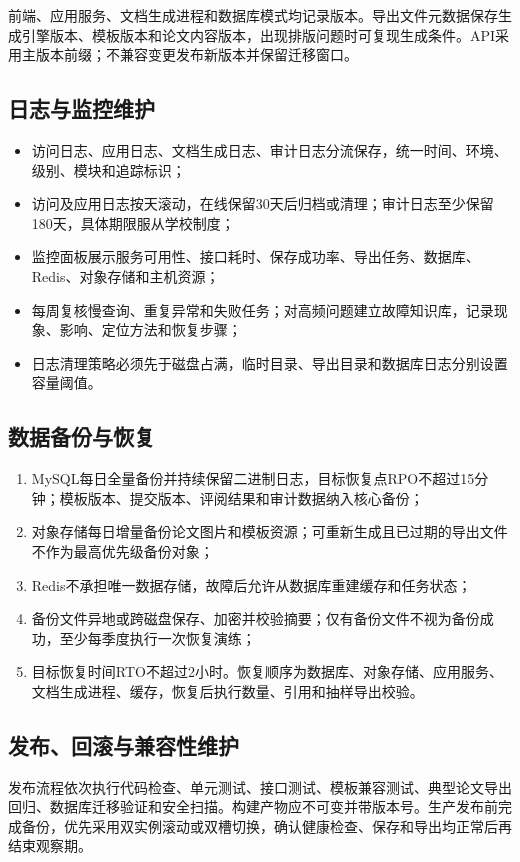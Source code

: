 \documentclass{../template/softeng}
\begin{document}
	前端、应用服务、文档生成进程和数据库模式均记录版本。导出文件元数据保存生成引擎版本、模板版本和论文内容版本，出现排版问题时可复现生成条件。API采用主版本前缀；不兼容变更发布新版本并保留迁移窗口。
	
	\subsection{日志与监控维护}
	\begin{itemize}
		\item 访问日志、应用日志、文档生成日志、审计日志分流保存，统一时间、环境、级别、模块和追踪标识；
		\item 访问及应用日志按天滚动，在线保留30天后归档或清理；审计日志至少保留180天，具体期限服从学校制度；
		\item 监控面板展示服务可用性、接口耗时、保存成功率、导出任务、数据库、Redis、对象存储和主机资源；
		\item 每周复核慢查询、重复异常和失败任务；对高频问题建立故障知识库，记录现象、影响、定位方法和恢复步骤；
		\item 日志清理策略必须先于磁盘占满，临时目录、导出目录和数据库日志分别设置容量阈值。
	\end{itemize}
	
	\subsection{数据备份与恢复}
	\begin{enumerate}
		\item MySQL每日全量备份并持续保留二进制日志，目标恢复点RPO不超过15分钟；模板版本、提交版本、评阅结果和审计数据纳入核心备份；
		\item 对象存储每日增量备份论文图片和模板资源；可重新生成且已过期的导出文件不作为最高优先级备份对象；
		\item Redis不承担唯一数据存储，故障后允许从数据库重建缓存和任务状态；
		\item 备份文件异地或跨磁盘保存、加密并校验摘要；仅有备份文件不视为备份成功，至少每季度执行一次恢复演练；
		\item 目标恢复时间RTO不超过2小时。恢复顺序为数据库、对象存储、应用服务、文档生成进程、缓存，恢复后执行数量、引用和抽样导出校验。
	\end{enumerate}
	
	\subsection{发布、回滚与兼容性维护}
	发布流程依次执行代码检查、单元测试、接口测试、模板兼容测试、典型论文导出回归、数据库迁移验证和安全扫描。构建产物应不可变并带版本号。生产发布前完成备份，优先采用双实例滚动或双槽切换，确认健康检查、保存和导出均正常后再结束观察期。
	
\end{document}
